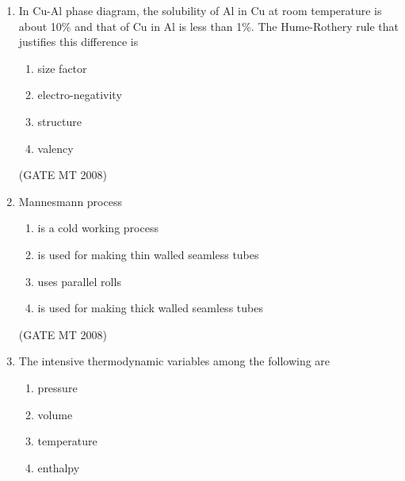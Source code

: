 \documentclass[journal, 11pt, onecolumn]{IEEEtran}
\theoremstyle{remark}
\begin{document}
\begin{enumerate}
\begin{multicols}{4}
\begin{enumerate}
\item 2
\item 3 
\item 4
\item 5
\end{enumerate}
\end{multicols}

\hfill(GATE MT 2008)

\item In Cu-Al phase diagram, the solubility of Al in Cu at room temperature is about 10\% and that of Cu in Al is less than 1\%. The Hume-Rothery rule that justifies this difference is

\begin{multicols}{2}
\begin{enumerate}
\item size factor
\item electro-negativity
\item structure
\item valency
\end{enumerate}
\end{multicols}

\hfill(GATE MT 2008)

\item Mannesmann process

\begin{multicols}{1}
\begin{enumerate}
\item is a cold working process
\item is used for making thin walled seamless tubes 
\item uses parallel rolls
\item is used for making thick walled seamless tubes
\end{enumerate}
\end{multicols}

\hfill(GATE MT 2008)

\item The intensive thermodynamic variables among the following are

\begin{multicols}{4}
\begin{enumerate}
\item pressure
\item volume 
\item temperature
\item enthalpy
\end{enumerate}
\end{multicols}


\end{enumerate}
\end{document}

